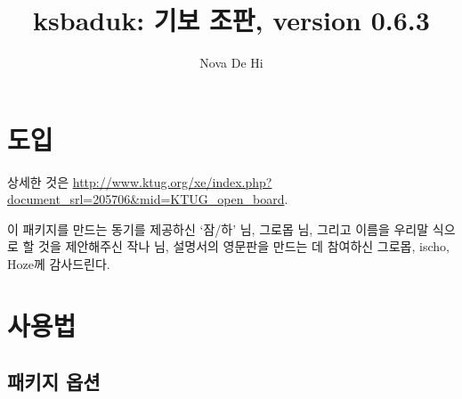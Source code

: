 \documentclass[figtabcapt,a4paper]{oblivoir}
\begin{document}
\title{ksbaduk: 기보 조판, version 0.6.3}
\author{Nova De Hi}
\maketitle

\tableofcontents*

\listoffigures*

\section{도입}

상세한 것은 \url{http://www.ktug.org/xe/index.php?document_srl=205706&mid=KTUG_open_board}.

이 패키지를 만드는 동기를 제공하신 `잠/하' 님, 그로몹 님, 그리고 이름을 우리말 식으로 할 것을 제안해주신 작나 님, 설명서의 영문판을 만드는 데 참여하신 그로몹, ischo, Hoze께 감사드린다.

\section{사용법}

\subsection{패키지 옵션}

\begin{boxedverbatim}
\usepackage[%
    ball, %
    badukpancolor=<color>,
    badukpansize=<number>,
    posmark,
    imageback,
    imagefile=<file>,
    textcmds,
    numberfont=<font>,
    tmarkfont=<font>
]{ksbaduk}
\end{boxedverbatim}
\end{document}

